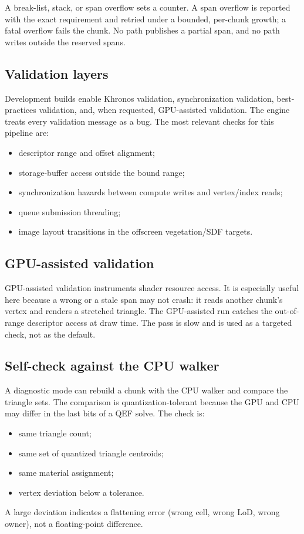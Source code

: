\begin{invariant}
A break-list, stack, or span overflow sets a counter.  A span overflow is
reported with the exact requirement and retried under a bounded, per-chunk
growth; a fatal overflow fails the chunk.  No path publishes a partial
span, and no path writes outside the reserved spans.
\end{invariant}

\subsection{Validation layers}

Development builds enable Khronos validation, synchronization validation,
best-practices validation, and, when requested, GPU-assisted validation.
The engine treats every validation message as a bug.  The most relevant
checks for this pipeline are:
\begin{itemize}
\item descriptor range and offset alignment;
\item storage-buffer access outside the bound range;
\item synchronization hazards between compute writes and vertex/index
  reads;
\item queue submission threading;
\item image layout transitions in the offscreen vegetation/SDF targets.
\end{itemize}

\subsection{GPU-assisted validation}

GPU-assisted validation instruments shader resource access.  It is
especially useful here because a wrong  or a stale span
may not crash: it reads another chunk's vertex and renders a stretched
triangle.  The GPU-assisted run catches the out-of-range descriptor access
at draw time.  The pass is slow and is used as a targeted check, not as the
default.

\subsection{Self-check against the CPU walker}

A diagnostic mode can rebuild a chunk with the CPU walker and compare the
triangle sets.  The comparison is quantization-tolerant because the GPU
and CPU may differ in the last bits of a QEF solve.  The check is:
\begin{itemize}
\item same triangle count;
\item same set of quantized triangle centroids;
\item same material assignment;
\item vertex deviation below a tolerance.
\end{itemize}
A large deviation indicates a flattening error (wrong cell, wrong LoD,
wrong owner), not a floating-point difference.

